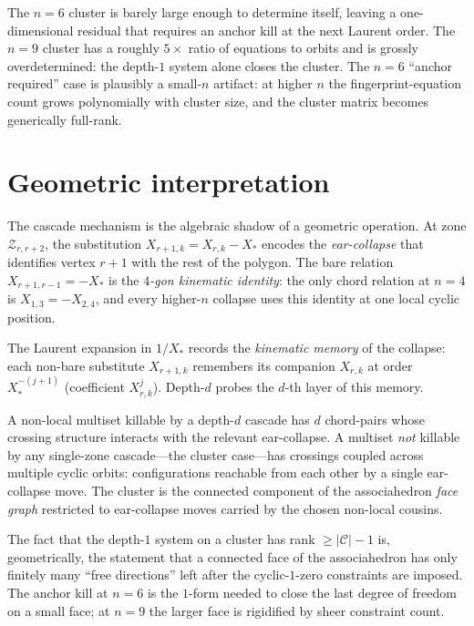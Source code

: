 \documentclass[11pt]{article}
\theoremstyle{definition}
\begin{document}
The $n=6$ cluster is barely large enough to determine itself,
leaving a one-dimensional residual that requires an anchor kill
at the next Laurent order. The $n=9$ cluster has a roughly
$5\!\times$ ratio of equations to orbits and is grossly
overdetermined: the depth-$1$ system alone closes the cluster.
The $n=6$ ``anchor required'' case is plausibly a small-$n$
artifact: at higher $n$ the fingerprint-equation count grows
polynomially with cluster size, and the cluster matrix becomes
generically full-rank.

\section{Geometric interpretation}\label{sec:geom}

The cascade mechanism is the algebraic shadow of a geometric
operation. At zone $\mathcal Z_{r,r+2}$, the substitution
$X_{r+1,k}=X_{r,k}-X_*$ encodes the \emph{ear-collapse} that
identifies vertex $r{+}1$ with the rest of the polygon. The bare
relation $X_{r+1,r-1}=-X_*$ is the \emph{$4$-gon kinematic
identity}: the only chord relation at $n=4$ is $X_{1,3}=-X_{2,4}$,
and every higher-$n$ collapse uses this identity at one local
cyclic position.

The Laurent expansion in $1/X_*$ records the \emph{kinematic
memory} of the collapse: each non-bare substitute $X_{r+1,k}$
remembers its companion $X_{r,k}$ at order $X_*^{-(j+1)}$
(coefficient $X_{r,k}^{j}$). Depth-$d$ probes the $d$-th layer of
this memory.

A non-local multiset killable by a depth-$d$ cascade has $d$
chord-pairs whose crossing structure interacts with the relevant
ear-collapse. A multiset \emph{not} killable by any single-zone
cascade---the cluster case---has crossings coupled across multiple
cyclic orbits: configurations reachable from each other by a
single ear-collapse move. The cluster is the connected component
of the associahedron \emph{face graph} restricted to
ear-collapse moves carried by the chosen non-local cousins.

The fact that the depth-$1$ system on a cluster has rank
$\ge|\mathcal C|-1$ is, geometrically, the statement that a
connected face of the associahedron has only finitely many
``free directions'' left after the cyclic-$1$-zero constraints
are imposed. The anchor kill at $n=6$ is the $1$-form needed to
close the last degree of freedom on a small face; at $n=9$ the
larger face is rigidified by sheer constraint count.
\end{document}
